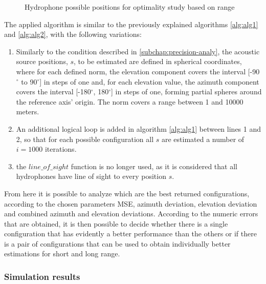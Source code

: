 \begin{itemize}
\begin{figure}[!htbp]
	\captionsetup{justification=centering,margin=2cm}
	\caption{Hydrophone possible positions for optimality study based on range}
	\label{fig:24h-config}
\end{figure}

The applied algorithm is similar to the previously explained algorithms \ref{alg:alg1} and \ref{alg:alg2}, with the following variations:

\begin{enumerate}
	\item Similarly to the condition described in \ref{subchap:precision-analy}, the acoustic source positions, $s$, to be estimated are defined in spherical coordinates, where for each defined norm, the elevation component covers the interval [-90$^{\circ}$ to 90$^{\circ}$] in steps of one and, for each elevation value, the azimuth component covers the interval [-180$^{\circ}$, 180$^{\circ}$] in steps of one, forming partial spheres around the reference axis' origin. The norm covers a range between 1 and 10000 meters.
	
	\item An additional logical loop is added in algorithm \ref{alg:alg1} between lines 1 and 2, so that for each possible configuration all $s$ are estimated a number of $i = 1000$ iterations.
	
	\item the $line\_of\_sight$ function is no longer used, as it is considered that all hydrophones have line of sight to every position $s$.
\end{enumerate}

From here it is possible to analyze which are the best returned configurations, according to the chosen parameters MSE, azimuth deviation, elevation deviation and combined azimuth and elevation deviations. According to the numeric errors that are obtained, it is then possible to decide whether there is a single configuration that has evidently a better performance than the others or if there is a pair of configurations that can be used to obtain individually better estimations for short and long range.

\subsubsection{Simulation results}


\end{itemize}

